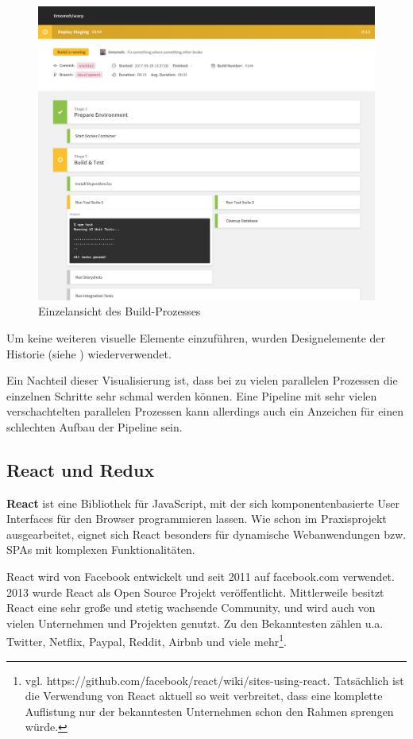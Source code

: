 \begin{figure}[h]
  \caption{Einzelansicht des Build-Prozesses}
  \label{fig:pipeline-overview}
  \centering
    \includegraphics[width=\textwidth]{assets/pipeline-overview}
\end{figure}

Um keine weiteren visuelle Elemente einzuführen, wurden Designelemente der Historie (siehe ) wiederverwendet.

Ein Nachteil dieser Visualisierung ist, dass bei zu vielen parallelen Prozessen die einzelnen Schritte sehr schmal werden können. Eine Pipeline mit sehr vielen verschachtelten parallelen Prozessen kann allerdings auch ein Anzeichen für einen schlechten Aufbau der Pipeline sein.

\subsection{React und Redux}
\label{subsec:react-redux}

\textbf{React} ist eine Bibliothek für JavaScript, mit der sich komponentenbasierte User Interfaces für den Browser programmieren lassen. Wie schon im Praxisprojekt \citep{Maemecke2017} ausgearbeitet, eignet sich React besonders für dynamische Web\-anwendungen bzw. \acp{SPA} mit komplexen Funktionalitäten.

React wird von Facebook entwickelt und seit 2011 auf facebook.com verwendet. 2013 wurde React als Open Source Projekt veröffentlicht. Mittlerweile besitzt React eine sehr große und stetig wachsende Community, und wird auch von vielen Unternehmen und Projekten genutzt. Zu den Bekanntesten zählen u.a. Twitter, Netflix, Paypal, Reddit, Airbnb und viele mehr\footnote{vgl. https://github.com/facebook/react/wiki/sites-using-react. Tatsächlich ist die Verwendung von React aktuell so weit verbreitet, dass eine komplette Auflistung nur der bekanntesten Unternehmen schon den Rahmen sprengen würde.}.

